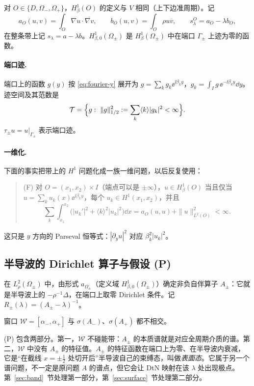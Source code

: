 \documentclass[11pt,a4paper,fontset=fandol]{ctexart}
\begin{document}
对 $O\in\{D,\Omega_-,\Omega_+\}$，$H^1_\beta(O)$ 的定义与 $V$ 相同（上下边准周期）。记
\[
a_O(u,v)=\int_O\nabla u\cdot\overline{\nabla v},\qquad b_O(u,v)=\int_O\rho u\overline v,\qquad s^O_\lambda=a_O-\lambda b_O ,
\]
在整条带上记 $s_\lambda=a-\lambda b$。$H^1_{\beta,0}(\Omega_\pm)$ 是 $H^1_\beta(\Omega_\pm)$ 中在端口 $\Gamma_\pm$ 上迹为零的函数。

\paragraph{端口迹.} 端口上的函数 $g(y)$ 按 \eqref{eq:fourier-y} 展开为 $g=\sum_kg_k\ee^{\ii\beta_ky}$，$g_k=\int_Ig\,\ee^{-\ii\beta_ky}\dd y$。迹空间及其范数是
\[
\mathcal T=\Bigl\{g:\ \|g\|_{1/2}^2:=\sum_k\langle k\rangle|g_k|^2<\infty\Bigr\}.
\]
$\tau_\pm u=u|_{\Gamma_\pm}$ 表示端口迹。

\paragraph{一维化.} 下面的事实把带上的 $H^1$ 问题化成一族一维问题，以后反复使用：
\begin{quote}
(F) 对 $O=(x_1,x_2)\times I$（端点可以是 $\pm\infty$），$u\in H^1_\beta(O)$ 当且仅当 $u=\sum_ku_k(x)\ee^{\ii\beta_ky}$，每个 $u_k\in H^1(x_1,x_2)$，并且
\[
\sum_k\int_{x_1}^{x_2}\bigl(|u_k'|^2+\langle k\rangle^2|u_k|^2\bigr)\dd x=a_O(u,u)+\|u\|_{L^2(O)}^2<\infty .
\]
\end{quote}
这只是 $y$ 方向的 Parseval 恒等式：$|\partial_yu|^2$ 对应 $\beta_k^2|u_k|^2$。

\subsection{半导波的 Dirichlet 算子与假设 (P)}

在 $L^2_\rho(\Omega_\pm)$ 中，由形式 $a_{\Omega_\pm}$（定义域 $H^1_{\beta,0}(\Omega_\pm)$）确定非负自伴算子 $A_\pm$：它就是半导波上的 $-\rho^{-1}\Delta$，在端口上取零 Dirichlet 条件。记 $R_\pm(\lambda)=(A_\pm-\lambda)^{-1}$。

\begin{assumption}[假设 (P)]
\label{ass:P}
窗口 $\mathcal W=[\alpha_-,\alpha_+]$ 与 $\sigma(A_-)$、$\sigma(A_+)$ 都不相交。
\end{assumption}

(P) 包含两部分。第一，$\mathcal W$ 不碰能带：$A_\pm$ 的本质谱就是对应全周期介质的谱。第二，$\mathcal W$ 中没有 $A_\pm$ 的特征值。$A_\pm$ 的特征函数在端口上为零、在半导波内衰减，它是“在截线 $x=\pm\tfrac12$ 处切开后”半导波自己的束缚态，叫做\emph{表面态}。它属于另一个谱问题，不一定是原问题 $A$ 的谱点，但它会让 DtN 映射在该 $\lambda$ 处出现极点。第~\ref{sec:band}~节处理第一部分，第~\ref{sec:surface}~节处理第二部分。
\end{document}
